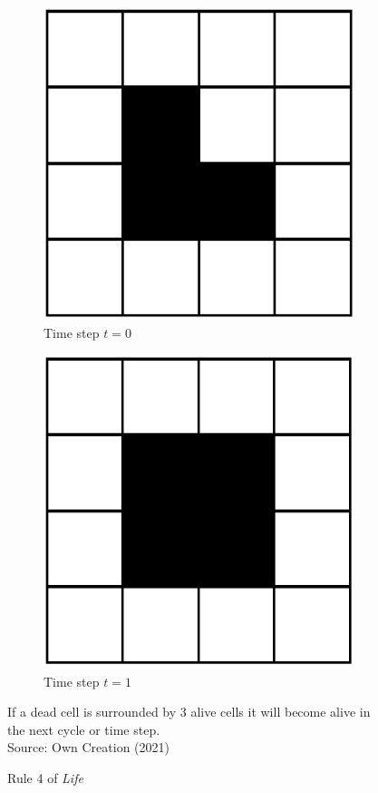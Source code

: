 \begin{figure}[H]
\centering
\begin{subfigure}{.5\textwidth}
  \centering
  \includegraphics[width=.4\linewidth]{Figures/Chapter2/rule4}
  \caption{Time step $t = 0$}
\end{subfigure}%
\begin{subfigure}{.5\textwidth}
  \centering
  \includegraphics[width=.4\linewidth]{Figures/Chapter2/rule4.1}
  \caption{Time step $t = 1$}
\end{subfigure}
\caption{Rule 4 of \textsl{Life}}
\begin{center}
If a dead cell is surrounded by 3 alive cells it will become alive in the next cycle or time step.\\
Source: Own Creation (2021)
\end{center}
\end{figure}

